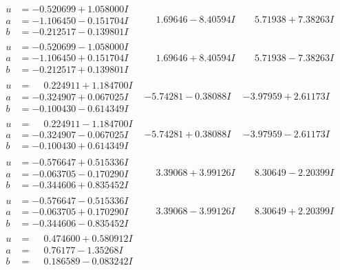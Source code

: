 \documentclass[1p]{elsarticle_modified}
\theoremstyle{definition}
\begin{document}
$$\begin{array}{c|c|c}
\begin{aligned}
u &= -0.520699 + 1.058000 I \\
a &= -1.106450 - 0.151704 I \\
b &= -0.212517 - 0.139801 I\end{aligned}
 & \phantom{-}1.69646 - 8.40594 I & \phantom{-}5.71938 + 7.38263 I \\ \hline\begin{aligned}
u &= -0.520699 - 1.058000 I \\
a &= -1.106450 + 0.151704 I \\
b &= -0.212517 + 0.139801 I\end{aligned}
 & \phantom{-}1.69646 + 8.40594 I & \phantom{-}5.71938 - 7.38263 I \\ \hline\begin{aligned}
u &= \phantom{-}0.224911 + 1.184700 I \\
a &= -0.324907 + 0.067025 I \\
b &= -0.100430 - 0.614349 I\end{aligned}
 & -5.74281 - 0.38088 I & -3.97959 + 2.61173 I \\ \hline\begin{aligned}
u &= \phantom{-}0.224911 - 1.184700 I \\
a &= -0.324907 - 0.067025 I \\
b &= -0.100430 + 0.614349 I\end{aligned}
 & -5.74281 + 0.38088 I & -3.97959 - 2.61173 I \\ \hline\begin{aligned}
u &= -0.576647 + 0.515336 I \\
a &= -0.063705 - 0.170290 I \\
b &= -0.344606 + 0.835452 I\end{aligned}
 & \phantom{-}3.39068 + 3.99126 I & \phantom{-}8.30649 - 2.20399 I \\ \hline\begin{aligned}
u &= -0.576647 - 0.515336 I \\
a &= -0.063705 + 0.170290 I \\
b &= -0.344606 - 0.835452 I\end{aligned}
 & \phantom{-}3.39068 - 3.99126 I & \phantom{-}8.30649 + 2.20399 I \\ \hline\begin{aligned}
u &= \phantom{-}0.474600 + 0.580912 I \\
a &= \phantom{-}0.76177 - 1.35268 I \\
b &= \phantom{-}0.186589 - 0.083242 I\end{aligned}

\end{array}$$
\end{document}

